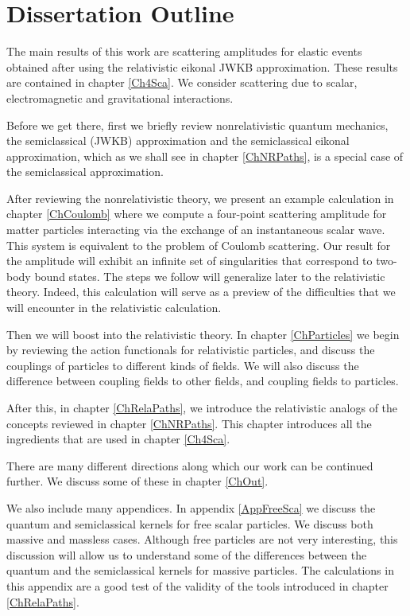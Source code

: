 \chapter{Dissertation Outline}
The main results of this work are scattering amplitudes for elastic events obtained after using the relativistic eikonal JWKB approximation. These results are contained in chapter \ref{Ch4Sca}. We consider scattering due to scalar, electromagnetic and gravitational interactions.

Before we get there, first we briefly review nonrelativistic quantum mechanics, the semiclassical (JWKB) approximation and the semiclassical eikonal approximation, which as we shall see in chapter \ref{ChNRPaths}, is a special case of the semiclassical approximation.

After reviewing the nonrelativistic theory, we present an example calculation in chapter \ref{ChCoulomb} where we compute a four-point scattering amplitude for matter particles interacting via the exchange of an instantaneous scalar wave. This system is equivalent to the problem of Coulomb scattering. Our result for the amplitude will exhibit an infinite set of singularities that correspond to two-body bound states. The steps we follow will generalize later to the relativistic theory. Indeed, this calculation will serve as a preview of the difficulties that we will encounter in the relativistic calculation.

Then we will boost into the relativistic theory. In chapter \ref{ChParticles} we begin by reviewing the action functionals for relativistic particles, and discuss the couplings of particles to different kinds of fields. We will also discuss the difference between coupling fields to other fields, and coupling fields to particles.

After this, in chapter \ref{ChRelaPaths}, we introduce the relativistic analogs of the concepts reviewed in chapter \ref{ChNRPaths}. This chapter introduces all the ingredients that are used in chapter \ref{Ch4Sca}.

There are many different directions along which our work can be continued further. We discuss some of these in chapter \ref{ChOut}.

We also include many appendices. In appendix \ref{AppFreeSca} we discuss the quantum and semiclassical kernels for free scalar particles. We discuss both massive and massless cases. Although free particles are not very interesting, this discussion will allow us to understand some of the differences between the quantum and the semiclassical kernels for massive particles. The calculations in this appendix are a good test of the validity of the tools introduced in chapter \ref{ChRelaPaths}.


